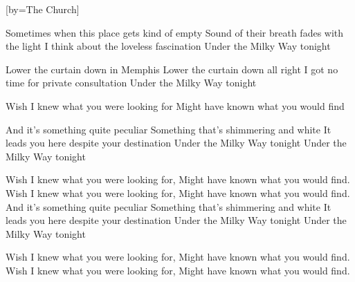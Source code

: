 

[by=The Church]



\begin{Large}

\beginverse
Sometimes when this place gets kind of empty
Sound of their breath fades with the light
I think about the loveless fascination
Under the Milky Way tonight
\endverse

\beginverse
Lower the curtain down in Memphis
Lower the curtain down all right
I got no time for private consultation
Under the Milky Way tonight
\endverse

\beginchorus
Wish I knew what you were looking for
Might have known what you would find
\endchorus

\beginverse
And it's something quite peculiar
Something that's shimmering and white
It leads you here despite your destination
Under the Milky Way tonight
Under the Milky Way tonight
\endverse

\beginchorus
Wish I knew what you were looking for, \brk Might have known what you would find.
Wish I knew what you were looking for, \brk Might have known what you would find.
\endchorus
\beginverse
And it's something quite peculiar
Something that's shimmering and white
It leads you here despite your destination
Under the Milky Way tonight
Under the Milky Way tonight
\endverse

\beginchorus
Wish I knew what you were looking for, \brk Might have known what you would find.
Wish I knew what you were looking for, \brk Might have known what you would find.
\endchorus

\end{Large}


\endsong
